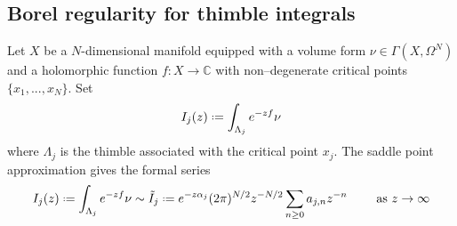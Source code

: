 \documentclass{article}
\let\Re\relax
\DeclareMathOperator{\Re}{Re}
\theoremstyle{definition}
\newcommand{\C}{\mathbb{C}}
\newcommand*{\defeq}{\mathrel{\vcenter{\baselineskip0.5ex \lineskiplimit0pt
                     \hbox{\scriptsize.}\hbox{\scriptsize.}}}%
                     =}
\newcommand{\borel}{\mathcal{B}}
\begin{document}




\subsection{Borel regularity for thimble integrals}\label{borel-reg-thimble}


Let $X$ be a $N$-dimensional manifold equipped with a volume form $\nu\in\Gamma(X,\Omega^N)$ and a holomorphic function $f\colon X\to\C$ with non--degenerate critical points $\{x_1,...,x_N\}$. Set
\begin{equation}\label{exp-int}
I_j(z)\defeq\int_{\Lambda_j}e^{-zf}\nu
\end{equation}
where $\Lambda_j$ is the thimble associated with the critical point $x_j$.  
The saddle point approximation gives the formal series 
\begin{equation}
{I}_{j}(z)\defeq\int_{\Lambda_j}e^{-zf}\nu\sim \tilde{I}_{j}\defeq e^{-z\alpha_j}(2\pi)^{N/2} z^{-N/2}\sum_{n\geq 0}a_{j,n}z^{-n} \qquad \text{ as } \Re z\to\infty
\end{equation}
\end{document}
